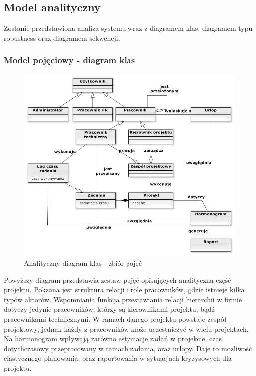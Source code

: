 \subsection{Model analityczny}

\begin{adjustwidth}{2em}{0pt}
Zostanie przedstawiona analiza systemu wraz z diagramem klas, diagramem typu robustness oraz diagramem sekwencji.
\end{adjustwidth}

\subsubsection{Model pojęciowy - diagram klas}


\begin{adjustwidth}{5em}{0pt}

\begin{figure}[H]
    \centering
    \includegraphics[scale=0.9]{diagramy/modelKlas/Classdiagram2.png}
    \caption{Analityczny diagram klas - zbiór pojęć}
    \label{fig:zbior_pojec}
\end{figure}

Powyższy diagram przedstawia zestaw pojęć opisujących analityczną część projektu. Pokzana jest struktura relacji i role pracowników, gdzie istnieje kilka typów aktorów. Wspomniania funkcja przestawiania relacji hierarchii w firmie dotyczy jedynie pracowników, którzy są kierownikami projektu, bądź pracownikami technicznymi. W ramach danego projektu powstaje zespół projektowy, jednak każdy z pracowników może uczestniczyć w wielu projektach. Na harmonogram wpływają zarówno estymacje zadań w projekcie, czas dotychczasowy przepracowany w ramach zadania, oraz urlopy. Daje to możliwość elastycznego planowania, oraz raportowania w sytuacjach kryzysowych dla projektu.

\end{adjustwidth}

